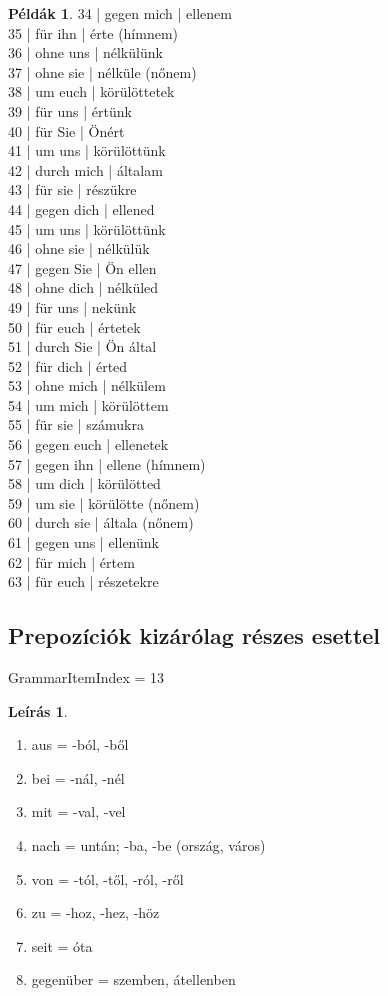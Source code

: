 \documentclass{article}
\theoremstyle{definition}
\newtheorem*{exmp}{Példák}
\newtheorem*{desc}{Leírás}
\begin{document}
\begin{exmp}
34 | gegen mich | ellenem\\
35 | für ihn | érte (hímnem)\\
36 | ohne uns | nélkülünk\\
37 | ohne sie | nélküle (nőnem)\\
38 | um euch | körülöttetek\\
39 | für uns | értünk\\
40 | für Sie | Önért\\
41 | um uns | körülöttünk\\
42 | durch mich | általam\\
43 | für sie | részükre\\
44 | gegen dich | ellened\\
45 | um uns | körülöttünk\\
46 | ohne sie | nélkülük\\
47 | gegen Sie | Ön ellen\\
48 | ohne dich | nélküled\\
49 | für uns | nekünk\\
50 | für euch | értetek\\
51 | durch Sie | Ön által\\
52 | für dich | érted\\
53 | ohne mich | nélkülem\\
54 | um mich | körülöttem\\
55 | für sie | számukra\\
56 | gegen euch | ellenetek\\
57 | gegen ihn | ellene (hímnem)\\
58 | um dich | körülötted\\
59 | um sie | körülötte (nőnem)\\
60 | durch sie | általa (nőnem)\\
61 | gegen uns | ellenünk\\
62 | für mich | értem\\
63 | für euch | részetekre\\
\end{exmp}

\subsection{Prepozíciók kizárólag részes esettel}

GrammarItemIndex = 13

\begin{desc}
\begin{enumerate}
\item aus = -ból, -ből
\item bei = -nál, -nél
\item mit = -val, -vel
\item nach = untán; -ba, -be (ország, város)
\item von = -tól, -től, -ról, -ről
\item zu = -hoz, -hez, -höz
\item seit = óta
\item gegenüber = szemben, átellenben
\end{enumerate}
\end{desc}
\end{document}
